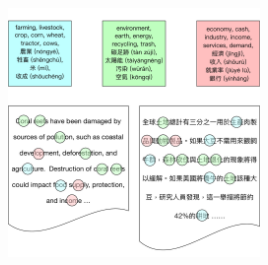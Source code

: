 \begin{frame}
\begin{center}
\begin{overprint}
\centerline{\includegraphics[width=0.5\textwidth]{topic_models/mtanchor/articles5}}
\end{overprint}
\end{center}

\end{frame}



